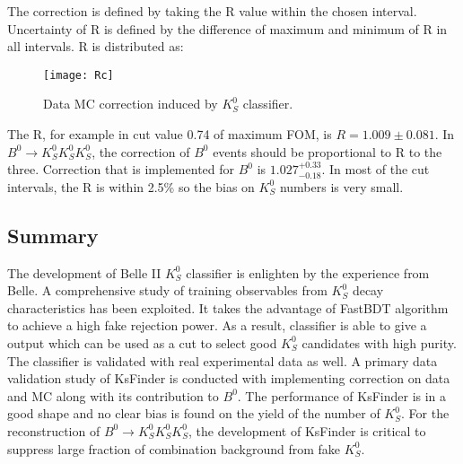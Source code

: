 The correction is defined by taking the R value within the chosen interval. Uncertainty of R is defined by the difference of maximum and minimum of R in all intervals. R is distributed as: 
\begin{figure}[H]
	\centering 
	\texttt{[image: Rc]}
	\caption{Data MC correction induced by $K_S^0$ classifier.}
\end{figure}

The R, for example in cut value 0.74 of maximum FOM, is $R = 1.009\pm 0.081$. In $B^0 \to K_S^0  K_S^0  K_S^0$, the correction of $B^0$ events should be proportional to R to the three.  Correction that is implemented for $B^0$ is $1.027^{+0.33}_{-0.18}$. In most of the cut intervals, the R is within 2.5\% so the bias on $K_S^0$ numbers is very small.
\subsection{Summary}
The development of Belle II $K_S^0$ classifier is enlighten by the experience from Belle. A comprehensive study of training observables from $K_S^0$ decay characteristics has been exploited. It takes the advantage of FastBDT algorithm to achieve a high fake rejection power. As a result, classifier is able to give a output which can be used as a cut to select good $K_S^0$ candidates with high purity. The classifier is validated with real experimental data as well. A primary data validation study of KsFinder is conducted with implementing correction on data and MC along with its contribution to $B^0$. The performance of KsFinder is in a good shape and no clear bias is found on the yield of the number of $K_S^0$. For the reconstruction of $B^0 \to K_S^0  K_S^0  K_S^0$, the development of KsFinder is critical to suppress large fraction of combination background from fake $K_S^0$.

